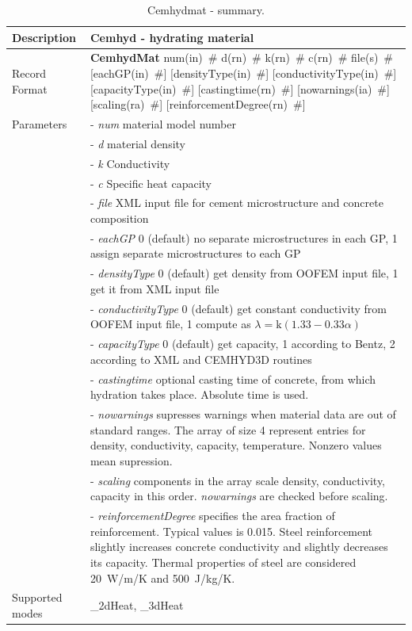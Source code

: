 \documentclass[a4paper]{article}
\newcommand{\descitem}[1]{{\noindent \bf #1}}
\newcommand{\elemparam}[2]{{{#1\tiny (#2)}~\#}}
\newcommand{\param}[1]{{\it #1}}
\newenvironment{mmt}{\begin{tabular}{|l|p{9cm}|}}{\end{tabular}\\}
\newenvironment{mmt}{\begin{tabular}{|l|l|}}{\end{tabular}\\}
\begin{document}
\begin{table}[!htb]
\begin{mmt}
\hline
Description & Cemhyd - hydrating material\\
\hline
Record Format & \descitem{CemhydMat} \elemparam{num}{in} \elemparam{d}{rn} \elemparam{k}{rn} \elemparam{c}{rn} \elemparam{file}{s} [\elemparam{eachGP}{in}] [\elemparam{densityType}{in}] [\elemparam{conductivityType}{in}] [\elemparam{capacityType}{in}] [\elemparam{castingtime}{rn}] [\elemparam{nowarnings}{ia}] [\elemparam{scaling}{ra}] [\elemparam{reinforcementDegree}{rn}]\\
Parameters &- \param{num} material model number\\
&- \param{d} material density\\
&- \param{k} Conductivity\\
&- \param{c} Specific heat capacity\\
&- \param{file} XML input file for cement microstructure and concrete composition\\
&- \param{eachGP} 0 (default) no separate microstructures in each GP, 1 assign separate microstructures to each GP\\
&- \param{densityType} 0 (default) get density from OOFEM input file, 1 get it from XML input file\\
&- \param{conductivityType} 0 (default) get constant conductivity from OOFEM input file, 1 compute as $\lambda = \textrm{k} (1.33-0.33\alpha)$ \cite{Ruiz:01}\\
&- \param{capacityType} 0 (default) get capacity, 1 according to Bentz, 2 according to XML and CEMHYD3D routines\\
&- \param{castingtime} optional casting time of concrete, from which hydration takes place. Absolute time is used.\\
&- \param{nowarnings} supresses warnings when material data are out of standard ranges. The array of size 4 represent entries for density, conductivity, capacity, temperature. Nonzero values mean supression.\\
&- \param{scaling} components in the array scale density, conductivity, capacity in this order. \param{nowarnings} are checked before scaling.\\
&- \param{reinforcementDegree} specifies the area fraction of reinforcement. Typical values is 0.015. Steel reinforcement slightly increases concrete conductivity and slightly decreases its capacity. Thermal properties of steel are considered 20~W/m/K and 500~J/kg/K.\\
Supported modes& \_2dHeat, \_3dHeat\\
\hline
\end{mmt}
\caption{Cemhydmat - summary.}
\label{Cemhydmat_table}
\end{table}
\end{document}
